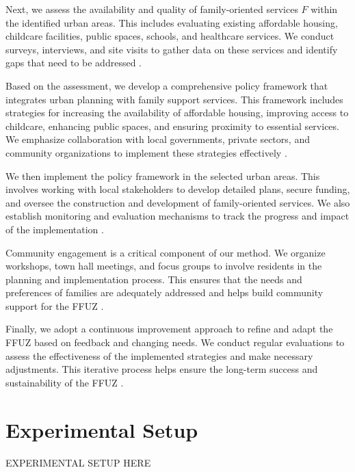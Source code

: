 \documentclass{article} %
\begin{document}
Next, we assess the availability and quality of family-oriented services \( F \) within the identified urban areas. This includes evaluating existing affordable housing, childcare facilities, public spaces, schools, and healthcare services. We conduct surveys, interviews, and site visits to gather data on these services and identify gaps that need to be addressed \citep{shanahan2023role}.

Based on the assessment, we develop a comprehensive policy framework that integrates urban planning with family support services. This framework includes strategies for increasing the availability of affordable housing, improving access to childcare, enhancing public spaces, and ensuring proximity to essential services. We emphasize collaboration with local governments, private sectors, and community organizations to implement these strategies effectively \citep{wang2023describe}.

We then implement the policy framework in the selected urban areas. This involves working with local stakeholders to develop detailed plans, secure funding, and oversee the construction and development of family-oriented services. We also establish monitoring and evaluation mechanisms to track the progress and impact of the implementation \citep{liu2023agentbench}.

Community engagement is a critical component of our method. We organize workshops, town hall meetings, and focus groups to involve residents in the planning and implementation process. This ensures that the needs and preferences of families are adequately addressed and helps build community support for the FFUZ \citep{poledna2023economic}.

Finally, we adopt a continuous improvement approach to refine and adapt the FFUZ based on feedback and changing needs. We conduct regular evaluations to assess the effectiveness of the implemented strategies and make necessary adjustments. This iterative process helps ensure the long-term success and sustainability of the FFUZ \citep{west2023agent}.

\section{Experimental Setup}
\label{sec:experimental}
EXPERIMENTAL SETUP HERE
\end{document}
